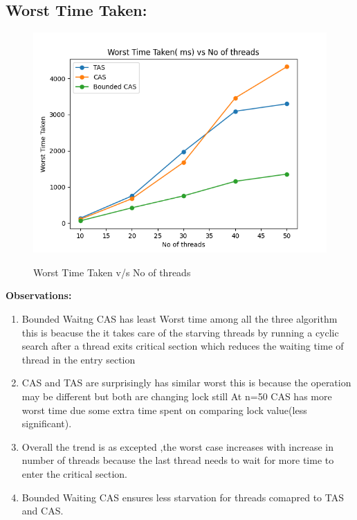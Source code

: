 \documentclass[10pt,a4paper]{article}
\begin{document}
\subsection{Worst Time Taken:}
 \begin{figure}[!ht]
	\includegraphics[scale = 0.8]{fig2}
	\label{}
	\caption{Worst Time Taken v/s No of threads}
\end{figure}
\textbf{Observations:}
\begin{enumerate}
	\item Bounded Waitng CAS has least Worst time among all the three algorithm this is beacuse the it takes care of the starving threads  by running a cyclic search after a thread exits critical section which reduces the waiting time of thread in the entry section
	\item CAS and TAS are surprisingly has similar worst this is because the operation may be different but both are changing lock still At n=50 CAS has more worst time due some extra time spent on comparing lock value(less significant).  
	\item Overall the trend is as excepted ,the worst case increases with increase in number of threads because the last thread needs to wait for more time to enter the critical section.
	\item Bounded Waiting CAS ensures less starvation for threads comapred to TAS and CAS.
\end{enumerate}
\end{document}
